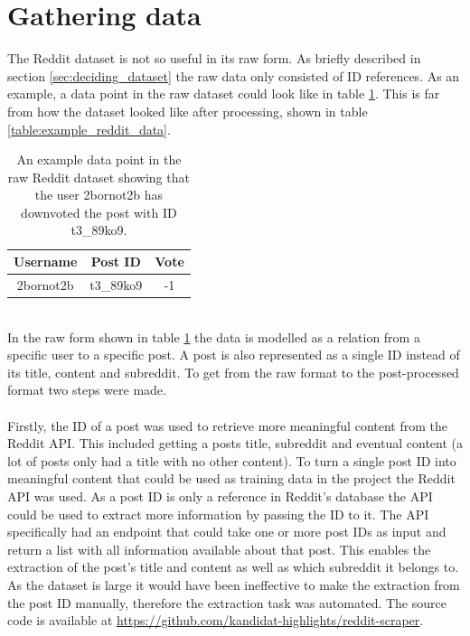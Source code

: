 \section{Gathering data}\label{sec:gathering_data}
The Reddit dataset is not so useful in its raw form. As briefly described in section \ref{sec:deciding_dataset} the raw data only consisted of ID references. As an example, a data point in the raw dataset could look like in table \ref{table:raw_reddit_data}. This is far from how the dataset looked like after processing, shown in table \ref{table:example_reddit_data}.
\begin{table}[h!]
    \centering
    \begin{tabular}{ c c c } 
        \hline
        \textbf{Username} & \textbf{Post ID} & \textbf{Vote} \\
        \hline
        \hline
        2bornot2b & t3\_89ko9 &-1\\
        \hline
    \end{tabular}
    \caption{An example data point in the raw Reddit dataset showing that the user 2bornot2b has downvoted the post with ID t3\_89ko9.}
    \label{table:raw_reddit_data}
\end{table}
\\
In the raw form shown in table \ref{table:raw_reddit_data} the data is modelled as a relation from a specific user to a specific post. A post is also represented as a single ID instead of its title, content and subreddit. To get from the raw format to the post-processed format two steps were made.   
\\\\
Firstly, the ID of a post was used to retrieve more meaningful content from the Reddit API. This included getting a posts title, subreddit and eventual content (a lot of posts only had a title with no other content). To turn a single post ID into meaningful content that could be used as training data in the project the Reddit API was used. As a post ID is only a reference in Reddit's database the API could be used to extract more information by passing the ID to it. The API specifically had an endpoint that could take one or more post IDs as input and return a list with all information available about that post. This enables the extraction of the post's title and content as well as which subreddit it belongs to. As the dataset is large it would have been ineffective to make the extraction from the post ID manually, therefore the extraction task was automated. The source code is available at \url{https://github.com/kandidat-highlights/reddit-scraper}.
